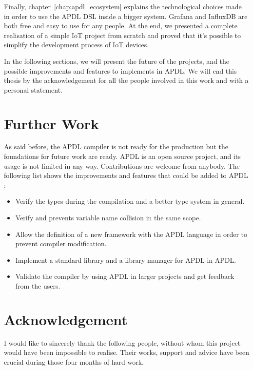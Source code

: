 Finally, chapter~\ref{chap:apdl_ecosystem} explains the technological choices
made in order to use the APDL DSL inside a bigger system. Grafana and InfluxDB
are both free and easy to use for any people. At the end, we presented a complete
realisation of a simple \gls{IoT} project from scratch and proved that it's
possible to simplify the development process of \gls{IoT} devices.

In the following sections, we will present the future of the projects, and
the possible improvements and features to implements in APDL. We will end this
thesis by the acknowledgement for all the people involved in this work and with a
personal statement.

\section{Further Work}
\label{sec:further_work}

As said before, the APDL compiler is not ready for the production but the
foundations for future work are ready. APDL is an open source project, and its
usage is not limited in any way. Contributions are welcome from anybody.
The following list shows the improvements and features that could be added to APDL
:

\begin{itemize}
\item Verify the types during the compilation and a better type system in
  general.
\item Verify and prevents variable name collision in the same scope.
\item Allow the definition of a new framework with the APDL language in order to
  prevent compiler modification.
\item Implement a standard library and a library manager for APDL in APDL.
\item Validate the compiler by using APDL in larger projects and get feedback
  from the users.
\end{itemize}

\section{Acknowledgement}
\label{sec:acknowledgement}

I would like to sincerely thank the following people, without whom this project
would have been impossible to realise. Their works, support and advice have
been crucial during those four months of hard work.

